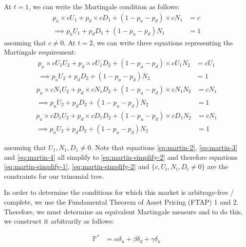 \documentclass{article}
\begin{document}
At $t=1$, we can write the Martingale condition as follows:
\begin{align}
    p_u\times cU_1 + p_d\times cD_1 + (1-p_u-p_d)\times cN_1 & = c \label{eq:martin-1} \\
    \implies p_uU_1 + p_dD_1 + (1-p_u-p_d)N_1 & = 1 \label{eq:martin-simplify-1}
\end{align}
assuming that $c\neq0$. At $t=2$, we can write three equations representing the Martingale requirement:
\begin{align}
    p_u\times cU_1U_2 + p_d\times cU_1D_2 + (1-p_u-p_d)\times cU_1N_2 & = cU_1 \label{eq:martin-2} \\
    \implies p_uU_2 + p_dD_2 + (1-p_u-p_d)N_2 & = 1 \label{eq:martin-simplify-2}
\end{align}
\begin{align}
    p_u\times cN_1U_2 + p_d\times cN_1D_2 + (1-p_u-p_d)\times cN_1N_2 & = cN_1 \label{eq:martin-3} \\
    \implies p_uU_2 + p_dD_2 + (1-p_u-p_d)N_2 & = 1 \nonumber
\end{align}
\begin{align}
    p_u\times cD_1U_2 + p_d\times cD_1D_2 + (1-p_u-p_d)\times cD_1N_2 & = cN_1 \label{eq:martin-4} \\
    \implies p_uU_2 + p_dD_2 + (1-p_u-p_d)N_2 & = 1 \nonumber
\end{align}

assuming that $U_1,N_1,D_1\neq0$. Note that equations \ref{eq:martin-2}, \ref{eq:martin-3} and \ref{eq:martin-4} all simplify to \ref{eq:martin-simplify-2} and therefore equations \ref{eq:martin-simplify-1}, \ref{eq:martin-simplify-2} and $\{c,U_t,N_t,D_t\neq0\}$ are the constraints for our trinomial tree.

In order to determine the conditions for which this market is arbitrage-free / complete, we use the Fundamental Theorem of Asset Pricing (FTAP) 1 and 2. Therefore, we must determine an equivalent Martingale measure and to do this, we construct it arbitrarily as follows:

\begin{align}
    \mathbb{P}^* & = \alpha\delta_u + \beta\delta_d + \gamma\delta_n \label{eq:pstar}
\end{align}
\end{document}
